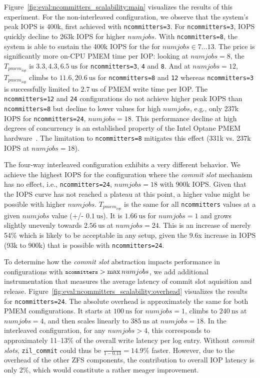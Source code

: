 \documentclass[12pt,a4paper,twoside]{book}
\begin{document}
Figure~\ref{fig:eval:ncommitters_scalability:main} visualizes the results of this experiment.
For the non-interleaved configuration, we observe that the system's peak IOPS is 400k, first achieved with \lstinline{ncommitters=3}.
For \lstinline{ncommitters=3}, IOPS quickly decline to 263k IOPS for higher $numjobs$.
With \lstinline{ncommitters=8}, the system is able to sustain the 400k IOPS for the for $numjobs \in 7 \dots 13$.
The price is significantly more on-CPU PMEM time per IOP:
looking at $numjobs = 8$, the $T_{pmem_{iop}}$ is $3.3, 4.3, 6.5~\text{us}$ for \lstinline{ncommitters=3}, \lstinline{4} and \lstinline{8}.
And at $numjobs = 12$, $T_{pmem_{iop}}$ climbs to $11.6, 20.6~\text{us}$ for \lstinline{ncommitters=8} and \lstinline{12} whereas \lstinline{ncommitters=3} is successfully limited to $2.7~\text{us}$ of PMEM write time per IOP.
The \lstinline{ncommitters=12} and \lstinline{24} configurations do not achieve higher peak IOPS than \lstinline{ncommitters=8} but decline to lower values for high $numjobs$, e.g., only 237k IOPS for \lstinline{ncommitters=24}, $numjobs = 18$.
This performance decline at high degrees of concurrency is an established property of the Intel Optane PMEM hardware~\cite{yangEmpiricalGuideBehavior2020}.
The limitation to \lstinline{ncommitters=8} mitigates this effect (331k vs. 237k IOPS at $numjobs = 18$).

The four-way interleaved configuration exhibits a very different behavior.
We achieve the highest IOPS for the configuration where the \textit{commit slot} mechanism has no effect, i.e., \lstinline{ncommitters=24}, $numjobs = 18$ with 900k IOPS.
Given that the IOPS curve has not reached a plateau at this point, a higher value might be possible with higher $numjobs$.
$T_{pmem_{iop}}$ is the same for all \lstinline{ncommitters} values at a given $numjobs$ value (+/- $0.1~\text{us}$).
It is $1.66~\text{us}$ for $numjobs = 1$ and grows slightly unevenly towards $2.56~\text{us}$ at $numjobs = 24$.
This is an increase of merely 54\% which is likely to be acceptable in any setup, given the 9.6x increase in IOPS (93k to 900k) that is possible with \lstinline{ncommitters=24}.

To determine how the \textit{commit slot} abstraction impacts performance in configurations with ${\texttt{\footnotesize ncommitters}} > \max numjobs$, we add additional instrumentation that measures the average latency of commit slot aquisition and release.
Figure~\ref{fig:eval:ncommitters_scalability:overhead} visualizes the results for \lstinline{ncommitters=24}.
The absolute overhead is approximately the same for both PMEM comfigurations.
It starts at $100~\text{ns}$ for $numjobs = 1$, climbs to $240~\text{ns}$ at $numjobs = 4$, and then scales linearly to $385~\text{ns}$ at $numjobs = 18$.
In the interleaved configuration, for any $numjobs > 4$, this corresponds to approximately 11--13\% of the overall write latency per log entry.
Without \textit{commit slots}, \lstinline{zil_commit} could thus be $\frac{1}{1 - 0.13} = 14.9\%$ faster.
However, due to the overhead of the other ZFS components, the contribution to overall IOP latency is only 2\%, which would constitute a rather meager improvement.
\end{document}

